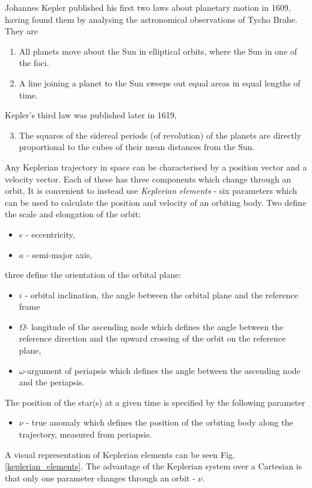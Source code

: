 Johannes Kepler published his first two laws about planetary motion in 1609, having found them by analysing the astronomical observations of Tycho Brahe. They are
%
\begin{enumerate}
    \item All planets move about the Sun in elliptical orbits, where the Sun in one of the foci.
    
    \item A line joining a planet to the Sun sweeps out equal areas in equal lengths of time.
\end{enumerate}
%
Kepler's third law was published later in 1619,
%
\begin{enumerate}
  \setcounter{enumi}{2}
    \item  The squares of the sidereal periods (of revolution) of the planets are directly proportional to the cubes of their mean distances from the Sun. 
\end{enumerate}
%
Any Keplerian trajectory in space can be characterised by a position vector and a velocity vector. Each of these has three components which change through an orbit. It is convenient to instead use \textit{Keplerian elements} - six parameters which can be used to calculate the position and velocity of an orbiting body. Two define the scale and  elongation of the orbit:
%
\begin{itemize}
\item $e$ - eccentricity,
\item $a$ - semi-major axis,
\end{itemize}
%
three define the orientation of the orbital plane:
%
\begin{itemize}
\item $i$ - orbital inclination, the angle between the orbital plane and the reference frame
\item $\Omega$- longitude of the ascending node which defines the angle between the reference direction and the upward crossing of the orbit on the reference plane,
\item $\omega$-argument of periapsis which defines the angle between the ascending node and the periapsis.
\end{itemize}
%
The position of the star(s) at a given time is specified by the following parameter
%
\begin{itemize}
\item $\nu$ - true anomaly which defines the position of the orbiting body along the trajectory, measured from periapsis.
\end{itemize}
%
A visual representation of Keplerian elements can be seen Fig. \ref{keplerian_elements}. The advantage of the Keplerian system over a Cartesian is that only one parameter changes through an orbit - $\nu$.

